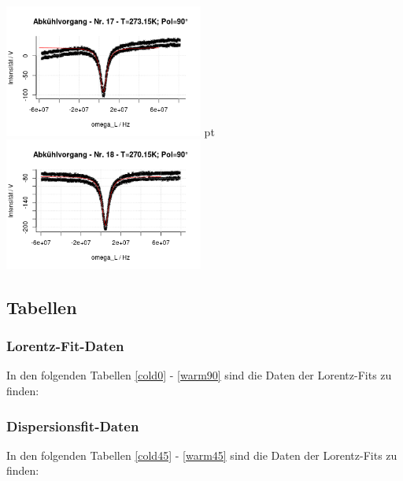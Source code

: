 \documentclass[12pt]{article}
\begin{document}
\begin{minipage}[h!]{\textwidth}
		\includegraphics[width=0.49\textwidth]{figures/cold90-17.png} pt	\includegraphics[width=0.49\textwidth]{figures/cold90-18.png}\vskip -10pt
	\end{minipage}\newpage

\subsection{Tabellen}\label{tabellen}

\subsubsection{Lorentz-Fit-Daten\label{LD}}

In den folgenden Tabellen \ref{cold0} - \ref{warm90} sind die Daten der Lorentz-Fits zu finden:







\subsubsection{Dispersionsfit-Daten\label{DD}}
In den folgenden Tabellen \ref{cold45} - \ref{warm45} sind die Daten der Lorentz-Fits zu finden:


%
\end{document}
